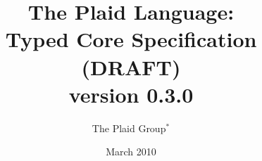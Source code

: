 \documentclass[12pt]{article}
\title{The Plaid Language:\\
Typed Core Specification (DRAFT)\\ %
\vspace{2ex}
version 0.3.0\\
\vspace{2ex}
}
\author{The Plaid Group$^{\ast}$
}
\date{March 2010}
\begin{document}
\renewcommand*{\thepage}{title-\arabic{page}} 
\maketitle
\renewcommand*{\thepage}{\arabic{page}} 







\end{document}
